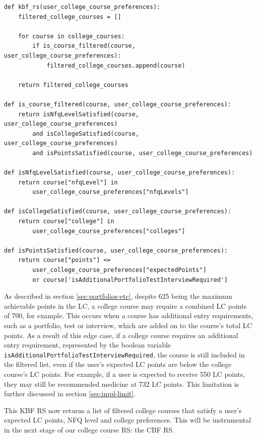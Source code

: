 \begin{lstlisting}[caption={Code for the KBF RS}, label={lst:kbf}]
def kbf_rs(user_college_course_preferences):
    filtered_college_courses = []

    for course in college_courses:
        if is_course_filtered(course, user_college_course_preferences):
            filtered_college_courses.append(course)

    return filtered_college_courses

def is_course_filtered(course, user_college_course_preferences):
    return isNfqLevelSatisfied(course, user_college_course_preferences)
        and isCollegeSatisfied(course, user_college_course_preferences)
        and isPointsSatisfied(course, user_college_course_preferences)

def isNfqLevelSatisfied(course, user_college_course_preferences):
    return course["nfqLevel"] in 
        user_college_course_preferences["nfqLevels"]

def isCollegeSatisfied(course, user_college_course_preferences):
    return course["college"] in 
        user_college_course_preferences["colleges"]

def isPointsSatisfied(course, user_college_course_preferences):
    return course["points"] <= 
        user_college_course_preferences["expectedPoints"] 
        or course['isAdditionalPortfolioTestInterviewRequired']
\end{lstlisting}

As described in section \ref{sec:portfolios-etc}, despite 625 being the maximum achievable points in the LC,
a college course may require a combined LC points of 700, for example.
This occurs when a course has additional entry requirements, such as a portfolio, test or interview, 
which are added on to the course's total LC points.
As a result of this edge case, if a college course requires an additional entry requirement, represented by 
the boolean variable \verb|isAdditionalPortfolioTestInterviewRequired|,
the course is still included in the filtered list,
even if the user's expected LC points are below the college course's LC points.
For example, if a user is expected to receive 550 LC points, they may still be recommended medicine at 732 LC points.
This limitation is further discussed in section \ref{sec:impl-limit}.

This KBF RS now returns a list of filtered college courses that satisfy a user's expected LC points,
NFQ level and college preferences.
This will be instrumental in the next stage of our college course RS: the CBF RS.

